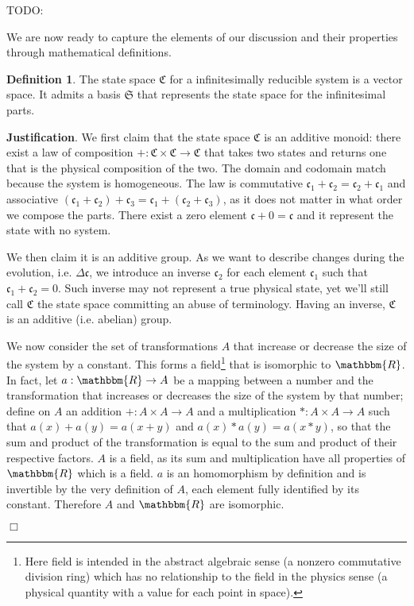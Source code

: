 \documentclass[aps,pra,10pt,twocolumn,floatfix,nofootinbib]{revtex4-1}
\theoremstyle{definition}
\newtheorem{defn}[thm]{Definition}
\newenvironment{justification}{\textbf{Justification}.}{$\Box$}
\begin{document}
TODO: 

We are now ready to capture the elements of our discussion and their properties through mathematical definitions.

\begin{defn}\label{vector space}
The state space $\mathfrak{C}$ for a infinitesimally reducible system is a vector space. It admits a basis $\mathfrak{S}$ that represents the state space for the infinitesimal parts.
\end{defn}

\begin{justification}
We first claim that the state space $\mathfrak{C}$ is an additive monoid: there exist a law of composition $+ : \mathfrak{C} \times \mathfrak{C} \rightarrow \mathfrak{C}$ that takes two states and returns one that is the physical composition of the two. The domain and codomain match because the system is homogeneous. The law is commutative $\mathfrak{c}_1 +\mathfrak{c}_2 = \mathfrak{c}_2+\mathfrak{c}_1$ and associative $(\mathfrak{c}_1 + \mathfrak{c}_2) + \mathfrak{c}_3 = \mathfrak{c}_1 + (\mathfrak{c}_2 + \mathfrak{c}_3)$, as it does not matter in what order we compose the parts. There exist a zero element $\mathfrak{c} + 0 = \mathfrak{c}$ and it represent the state with no system.

We then claim it is an additive group. As we want to describe changes during the evolution, i.e. $\Delta \mathfrak{c}$, we introduce an inverse $\mathfrak{c}_2$ for each element $\mathfrak{c}_1$ such that $\mathfrak{c}_1 + \mathfrak{c}_2 = 0$. Such inverse may not represent a true physical state, yet we'll still call $\mathfrak{C}$ the state space committing an abuse of terminology. Having an inverse, $\mathfrak{C}$ is an additive (i.e. abelian) group.

We now consider the set of transformations $A$ that increase or decrease the size of the system by a constant. This forms a field\footnote{Here field is intended in the abstract algebraic sense (a nonzero commutative division ring) which has no relationship to the field in the physics sense (a physical quantity with a value for each point in space).} that is isomorphic to $\mathbbm{R}$. In fact, let $a: \mathbbm{R} \rightarrow A$ be a mapping between a number and the transformation that increases or decreases the size of the system by that number; define on $A$ an addition $+: A \times A \rightarrow A$ and a multiplication $*: A \times A \rightarrow A$ such that $a(x) + a(y) = a(x+y)$ and $a(x) * a(y) = a(x*y)$, so that the sum and product of the transformation is equal to the sum and product of their respective factors. $A$ is a field, as its sum and multiplication have all properties of $\mathbbm{R}$ which is a field. $a$ is an homomorphism by definition and is invertible by the very definition of $A$, each element fully identified by its constant. Therefore $A$ and $\mathbbm{R}$ are isomorphic.


\end{justification}
\end{document}

